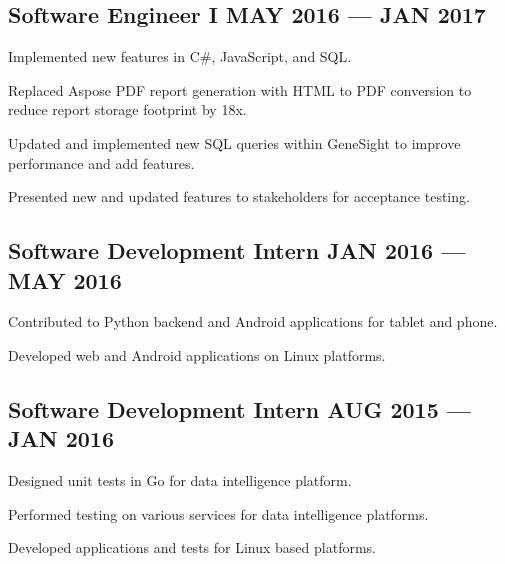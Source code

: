\subsection{{Software Engineer I \hfill MAY 2016 --- JAN 2017}}
\begin{zitemize}
\item Implemented new features in C\#, JavaScript, and SQL.
\item Replaced Aspose PDF report generation with HTML to PDF conversion to reduce report storage footprint by 18x.
\item Updated and implemented new SQL queries within GeneSight to improve performance and add features.
\item Presented new and updated features to stakeholders for acceptance testing.
\end{zitemize}

\subsection{{Software Development Intern \hfill JAN 2016 --- MAY 2016}}
\begin{zitemize}
\item Contributed to Python backend and Android applications for tablet and phone.
\item Developed web and Android applications on Linux platforms.
\end{zitemize}

\subsection{{Software Development Intern \hfill AUG 2015 --- JAN 2016}}
\begin{zitemize}
\item Designed unit tests in Go for data intelligence platform.
\item Performed testing on various services for data intelligence platforms.
\item Developed applications and tests for Linux based platforms.
\end{zitemize}


